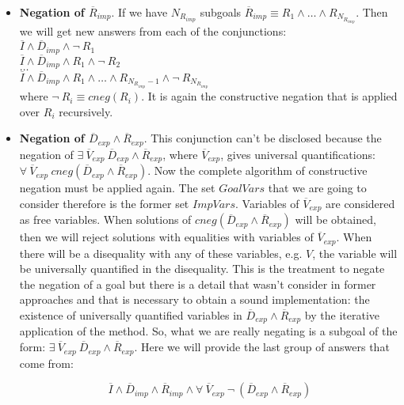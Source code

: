 \documentclass{llncs}
\begin{document}
\begin{itemize}
           \item {\bf Negation of $\overline{R}_{imp}$}. If we have
           $N_{R_{imp}}$ subgoals $\overline{R}_{imp} \equiv R_1
           \wedge \ldots \wedge R_{N_{R_{imp}}}$. Then we will get
           new answers from each of the conjunctions: \\

           $\overline{I} \wedge \overline{D}_{imp} \wedge \neg~ R_1 $ \\ 
           $\overline{I} \wedge \overline{D}_{imp} \wedge
           R_1 \wedge \neg~ R_2 $ \\ 
           $\ldots $ \\ 
           $\overline{I} \wedge \overline{D}_{imp} \wedge
           R_1 \wedge \ldots \wedge R_{N_{R_{imp}}-1} \wedge \neg~
           R_{N_{R_{imp}}}$ \\ 

           where $ \neg~ R_i \equiv cneg(R_i)$. It is again the
           constructive negation that is applied over $R_i$
           recursively.


           \item {\bf Negation of $\overline{D}_{exp} \wedge
           \overline{R}_{exp}$}. This conjunction can't be disclosed
           because the negation of $ \exists~ \overline{V}_{exp}~
           \overline{D}_{exp} \wedge \overline{R}_{exp}$, where
           $\overline{V}_{exp}$, gives universal quantifications:
           $\forall~ \overline{V}_{exp}~ cneg(\overline{D}_{exp}
           \wedge \overline{R}_{exp})$. Now the complete algorithm
           of constructive negation must be applied again. The set
           $GoalVars$ that we are going to consider therefore is the
           former set $ImpVars$. Variables of $\overline{V}_{exp}$ are
           considered as free variables. When solutions of
           $cneg(\overline{D}_{exp} \wedge \overline{R}_{exp})$ will
           be obtained, then we will reject solutions with equalities
           with variables of $\overline{V}_{exp}$. When there will be
           a disequality with any of these variables, e.g. $V$, the
           variable will be universally quantified in the disequality. 
           This is the treatment to negate the negation of a goal but there 
           is a detail that wasn't consider in former approaches and that is necessary to 
           obtain a sound implementation: the existence of universally quantified 
           variables in $\overline{D}_{exp} \wedge
           \overline{R}_{exp}$ by the iterative application of the method. 
           So, what we are really negating is a subgoal of the form: 
           $ \exists~ \overline{V}_{exp}~
           \overline{D}_{exp} \wedge \overline{R}_{exp}$. 
           Here we will provide the last group of answers that come
           from:

           \[\overline{I} \wedge \overline{D}_{imp}
           \wedge \overline{R}_{imp} \wedge \forall~
           \overline{V}_{exp}~ \neg~(\overline{D}_{exp} \wedge
           \overline{R}_{exp})\]

         \end{itemize}
\end{document}
